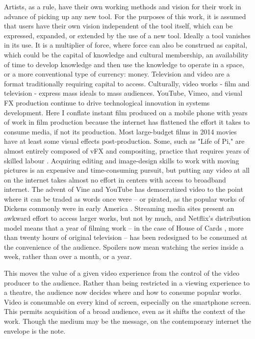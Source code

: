 Artists, as a rule, have their own working methods and vision for their work in advance of picking up any new tool. For the purposes of this work, it is assumed that users have their own vision independent of the tool itself, which can be expressed, expanded, or extended by the use of a new tool. Ideally a tool vanishes in its use. It is a multiplier of force, where force can also be construed as capital, which could be the capital of knowledge and cultural membership, an availability of time to develop knowledge and then use the knowledge to operate in a space, or a more conventional type of currency: money.
Television and video are a format traditionally requiring capital to access. Culturally, video works - film and television - express mass ideals to mass audiences. YouTube, Vimeo, and visual FX production continue to drive technological innovation in systems development. Here I conflate instant film produced on a mobile phone with years of work in film production because the internet has flattened the effort it takes to consume media, if not its production. Most large-budget films in 2014 movies have at least some visual effects post-production. Some, such as "Life of Pi," are almost entirely composed of vFX and compositing, practice that requires years of skilled labour \parencite{lifeofpi}. Acquiring editing and image-design skills to work with moving pictures is an expensive and time-consuming pursuit, but putting any video at all on the internet takes almost no effort in centers with access to broadband internet. The advent of Vine and YouTube has democratized video to the point where it can be traded as words once were – or pirated, as the popular works of Dickens commonly were in early America \parencite{dickenscastillo}. Streaming media sites present an awkward effort to access larger works, but not by much, and Netflix's distribution model means that a year of filming work – in the case of House of Cards \parencite{houseofcards}, more than twenty hours of original television – has been redesigned to be consumed at the convenience of the audience. Spoilers now mean watching the series inside a week, rather than over a month, or a year.

This moves the value of a given video experience from the control of the video producer to the audience. Rather than being restricted in a viewing experience to a theatre, the audience now decides where and how to consume popular works. Video is consumable on every kind of screen, especially on the smartphone screen. This permits acquisition of a broad audience, even as it shifts the context of the work. Though the medium may be the message, on the contemporary internet the envelope is the note.

